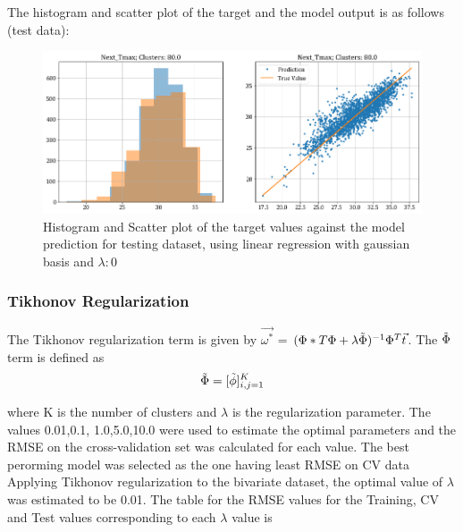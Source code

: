 \documentclass[12pt,a4paper]{article}
\newcommand{\noi}{\noindent}
\begin{document}
\noi
The histogram and scatter plot of the target and the model output is as follows (test data):
\begin{figure}[H]
    \centering
    \includegraphics[scale=0.49]{images/t3_d3/no_reg/T_max_test.png}
    \caption{Histogram and Scatter plot of the target values against the model prediction for testing dataset, using linear regression with gaussian basis and $\lambda: 0$}
\end{figure}

\subsubsection{Tikhonov Regularization} 
The Tikhonov regularization term is given by $\vec{\omega^*}$ = $(\Phi*T\Phi + \lambda \Tilde{\Phi})^{-1} \Phi^T \vec{t}$. The $\Tilde{\Phi}$ term is defined as 
\begin{equation}
    \Tilde{\Phi} = [\Tilde{\phi}]_{i,j = 1}^{K}
\end{equation}

where K is the number of clusters and $\lambda$ is the regularization parameter. The values 0.01,0.1, 1.0,5.0,10.0 were used to estimate the optimal parameters and the RMSE on the cross-validation set was calculated for each value. The best perorming model was selected as the one having least RMSE on CV data\\ 
Applying Tikhonov regularization to the bivariate dataset, the optimal value of $\lambda$ was estimated to be 0.01. 
 The table for the RMSE values for the Training, CV and Test values corresponding to each $\lambda$ value is

\end{document}
